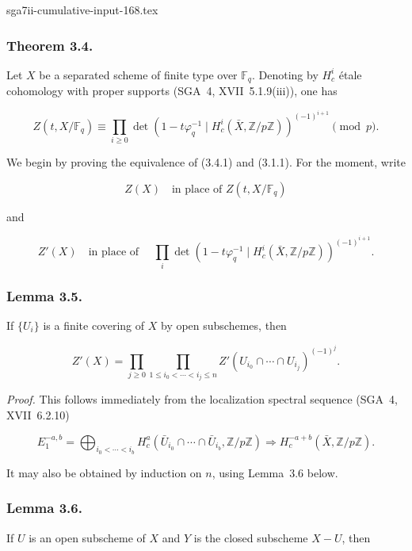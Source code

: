 \begin{filecontents*}{sga7ii-cumulative-input-168.tex}
\subsubsection*{Theorem 3.4.}
Let $X$ be a separated scheme of finite type over $\mathbb F_q$. Denoting by
$H_c^i$ étale cohomology with proper supports (SGA~4, XVII~5.1.9(iii)), one
has

\begin{equation}\tag{3.4.1}
Z(t,X/\mathbb F_q)
\equiv
\prod_{i\geq0}
\det\!\left(1-t\varphi_q^{-1}\mid
H_c^i(\bar X,\mathbb Z/p\mathbb Z)\right)^{(-1)^{i+1}}
\pmod p.
\end{equation}

We begin by proving the equivalence of (3.4.1) and (3.1.1). For the moment,
write

\begin{equation}\tag{3.4.2}
Z(X)\quad\text{in place of }Z(t,X/\mathbb F_q)
\end{equation}

and

\begin{equation}\tag{3.4.3}
Z'(X)\quad\text{in place of }\quad
\prod_i\det\!\left(1-t\varphi_q^{-1}\mid
H_c^i(\bar X,\mathbb Z/p\mathbb Z)\right)^{(-1)^{i+1}}.
\end{equation}

\subsubsection*{Lemma 3.5.}
If $\{U_i\}$ is a finite covering of $X$ by open subschemes, then

\begin{equation}\tag{3.5.1}
Z'(X)=
\prod_{j\geq0}
\prod_{1\leq i_0<\cdots<i_j\leq n}
Z'(U_{i_0}\cap\cdots\cap U_{i_j})^{(-1)^j}.
\end{equation}

\medskip
\noindent\emph{Proof.}
This follows immediately from the localization spectral sequence (SGA~4,
XVII~6.2.10)

\[
E_1^{-a,b}=\bigoplus_{i_0<\cdots<i_b}
H_c^a(\bar U_{i_0}\cap\cdots\cap\bar U_{i_b},\mathbb Z/p\mathbb Z)
\Longrightarrow H_c^{-a+b}(\bar X,\mathbb Z/p\mathbb Z).
\]

It may also be obtained by induction on $n$, using Lemma~3.6 below.

\subsubsection*{Lemma 3.6.}
If $U$ is an open subscheme of $X$ and $Y$ is the closed subscheme $X-U$, then


\end{filecontents*}
